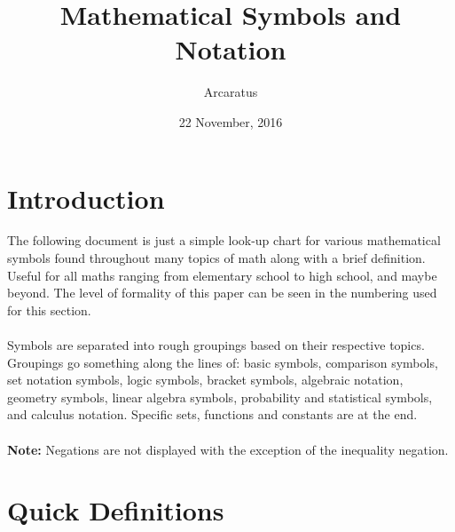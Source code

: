 \documentclass{article}
\title{Mathematical Symbols and Notation}
\author{Arcaratus}
\date{22 November, 2016}
\begin{document}
\maketitle

\setcounter{section}{-1}
\section{Introduction}
The following document is just a simple look-up chart for various mathematical
symbols found throughout many topics of math along with a brief definition. Useful for all maths ranging from elementary school to high school, and maybe beyond. The level of formality of this paper can be seen in the numbering used for this section.\\
\\
Symbols are separated into rough groupings based on their respective topics. Groupings go something along the lines of: basic symbols, comparison symbols, set notation symbols, logic symbols, bracket symbols, algebraic notation, geometry symbols, linear algebra symbols, probability and statistical symbols, and calculus notation. Specific sets, functions and constants are at the end.\\
\\
\textbf{Note:} Negations are not displayed with the exception of the inequality negation.

\section{Quick Definitions}
\end{document}
